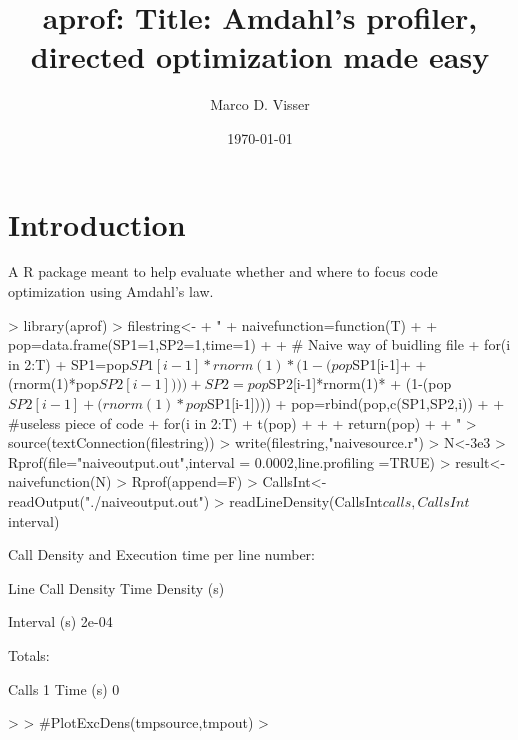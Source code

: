 \documentclass{article}
\begin{document}

\title{aprof: Title: Amdahl's profiler, directed optimization made easy}
\date{\today}
\author{Marco D. Visser}
\maketitle

\section{Introduction}

A R package meant to help evaluate whether and where to focus 
code optimization using Amdahl's law.

\begin{Schunk}
\begin{Sinput}
> library(aprof)
> filestring<-
+ "
+ naivefunction=function(T){
+ 
+ pop=data.frame(SP1=1,SP2=1,time=1)
+ 
+ # Naive way of buidling file
+ for(i in 2:T){
+ 	SP1=pop$SP1[i-1]*rnorm(1)*(1-(pop$SP1[i-1]+
+ 	(rnorm(1)*pop$SP2[i-1])))
+ 	SP2=pop$SP2[i-1]*rnorm(1)*
+ 	(1-(pop$SP2[i-1]+(rnorm(1)*pop$SP1[i-1])))
+ 	pop=rbind(pop,c(SP1,SP2,i))
+ }
+ #useless piece of code
+ for(i in 2:T){
+ t(pop)
+ }
+ 
+ return(pop)
+ }
+ "
> source(textConnection(filestring))
> write(filestring,"naivesource.r")
> N<-3e3
> Rprof(file="naiveoutput.out",interval = 0.0002,line.profiling =TRUE)
> result<-naivefunction(N)
> Rprof(append=F)
> CallsInt<-readOutput("./naiveoutput.out")
> readLineDensity(CallsInt$calls,CallsInt$interval)
\end{Sinput}
\begin{Soutput}
 Call Density and Execution time per line number:

      Line  Call Density  Time Density (s)

Interval (s)	 2e-04 


 Totals:

 Calls		 1 
 Time (s)	 0 
\end{Soutput}
\begin{Sinput}
> 
> #PlotExcDens(tmpsource,tmpout)
> 
\end{Sinput}
\end{Schunk}
\end{document}
